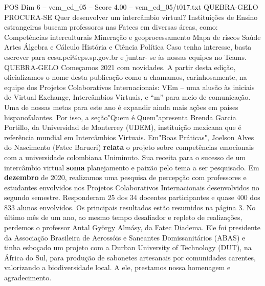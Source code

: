\begin{textsample}{POS Dim 6 – vem\_ed\_05 – Score 4.00 – vem\_ed\_05/t017.txt}  \label{ex:f6_pos_116}
QUEBRA-GELO PROCURA-SE Quer desenvolver um intercâmbio virtual?
Instituições de Ensino estrangeiras buscam professores nas Fatecs em diversas áreas, como: Competências interculturais Mineração e geoprocessamento Mapa de riscos Saúde Artes Álgebra e Cálculo História e Ciência Política Caso tenha interesse, basta escrever para cesu.pci@cps.sp.gov.br e juntar- se às nossas equipes no Teams.
QUEBRA-GELO Começamos 2021 com novidades.
A partir desta edição, oficializamos o nome desta publicação como a chamamos, carinhosamente, na equipe dos Projetos Colaborativos Internacionais: VEm – uma alusão às iniciais de Virtual Exchange, Intercâmbios Virtuais, e “m” para meio de comunicação.
Uma de nossas metas para este ano é expandir ainda mais ações em países hispanofalantes.
Por isso, a seção"Quem é Quem"apresenta Brenda Garcia Portillo, da Universidad de Monterrey (UDEM), instituição mexicana que é referência mundial em Intercâmbios Virtuais.
Em"Boas Práticas", Joelson Alves do Nascimento (Fatec Barueri) \textbf{relata} o projeto sobre competências emocionais com a universidade colombiana Uniminuto.
Sua receita para o sucesso de um intercâmbio virtual \textbf{soma} planejamento e paixão pelo tema a ser pesquisado.
Em \textbf{dezembro} de 2020, realizamos uma pesquisa de percepção com professores e estudantes envolvidos nos Projetos Colaborativos Internacionais desenvolvidos no segundo semestre.
Responderam 25 dos 34 docentes participantes e quase 400 dos 833 alunos envolvidos.
Os principais resultados estão resumidos na página 3.
No último mês de um ano, ao mesmo tempo desafiador e repleto de realizações, perdemos o professor Antal György Almásy, da Fatec Diadema.
Ele foi presidente da Associação Brasileira de Aerossóis e Saneantes Domissanitários (ABAS) e tinha esboçado um projeto com a Durban University of Technology (DUT), na África do Sul, para produção de sabonetes artesanais por comunidades carentes, valorizando a biodiversidade local.
A ele, prestamos nossa homenagem e agradecimento.

\end{textsample}
